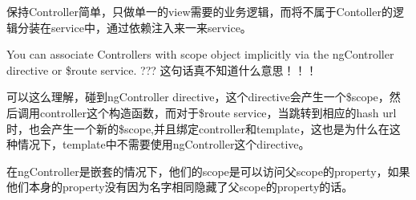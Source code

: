   保持Controller简单，只做单一的view需要的业务逻辑，而将不属于Contoller的逻辑分装在service中，通过依赖注入来一来service。

  You can associate Controllers with scope object implicitly via the ngController directive or \$route service. ??? 这句话真不知道什么意思！！！

  可以这么理解，碰到ngController directive，这个directive会产生一个\$scope，然后调用controller这个构造函数，而对于\$route service，当跳转到相应的hash url时，也会产生一个新的\$scope,并且绑定controller和template，这也是为什么在这种情况下，template中不需要使用ngController这个directive。

  在ngController是嵌套的情况下，他们的scope是可以访问父scope的property，如果他们本身的property没有因为名字相同隐藏了父scope的property的话。

  
  
